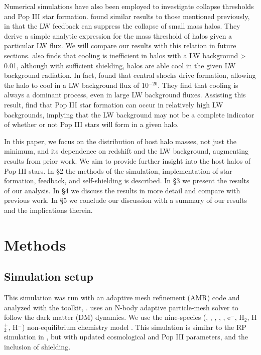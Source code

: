 \documentclass[a4paper,fleqn,usenatbib]{mnras}
\begin{document}
Numerical simulations have also been employed to investigate collapse thresholds and Pop III star formation. \citet{Machacek01} found similar results to those mentioned previously, in that the LW feedback can suppress the collapse of small mass halos. They derive a simple analytic expression for the mass threshold of halos given a particular LW flux. We will compare our results with this relation in future sections. \citet{yoshida03} also finds that cooling is inefficient in halos with a LW background > 0.01, although with sufficient \hh{} shielding, halos are able cool in the given LW background radiation. In fact, \citet{Wise07_UVB} found that central shocks drive \hh{} formation, allowing the halo to cool in a LW background flux of 10$^{-20}$. They find that \hh{} cooling is always a dominant process, even in large LW background fluxes. Assisting this result, \citet{OShea08} find that Pop III star formation can occur in relatively high LW backgrounds, implying that the LW background may not be a complete indicator of whether or not Pop III stars will form in a given halo.  

In this paper, we focus on the distribution of host halo masses, not just the minimum, and its dependence on redshift and the LW background, augmenting results from prior work. We aim to provide further insight into the host halos of Pop III stars. In \S 2 the methods of the simulation, implementation of star formation, feedback, and \hh{} self-shielding is described. In \S 3 we present the results of our analysis. In \S 4 we discuss the results in more detail and compare with previous work. In \S 5 we conclude our discussion with a summary of our results and the implications therein.

\section{Methods}
\subsection{Simulation setup}
This simulation was run with an adaptive mesh refinement (AMR) code 
\enzo{} \citep{Enzo} and analyzed with the toolkit, \yt{} \citep{yt_full_paper}. \enzo{} uses an N-body adaptive particle-mesh solver \citep{Efstathiou85, Couchman91, BryanNorman1997} to follow the dark matter (DM) dynamics. We use the nine-species (\hi, \hii, \hei, \heii, \heiii, e$^{-}$, H$_{2}$, H$_{2}^{+}$, H$^{-}$) non-equilibrium chemistry model \citep{Abel97, Anninos97}. This simulation is similar to the RP simulation in 
\citet[hereafter W12]{Wise12_RP}, but with updated cosmological and Pop III parameters, and the inclusion of \hh{} shielding.
\end{document}

